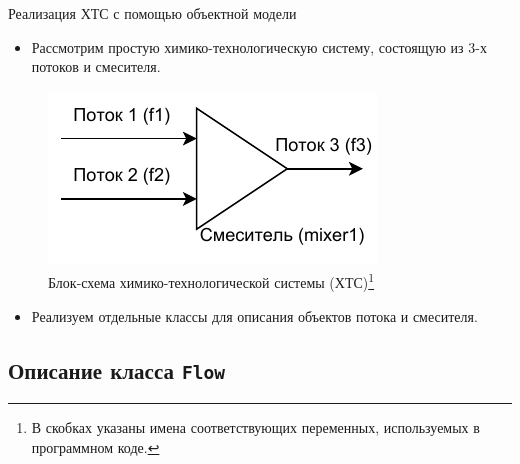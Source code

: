 \documentclass[aspectratio=169, mathserif]{beamer}	%
\begin{document}
\begin{frame}[fragile]{Реализация ХТС с помощью объектной модели}
\scriptsize
\begin{itemize}
\item Рассмотрим простую химико-технологическую систему, состоящую из 3-х потоков и смесителя.
\end{itemize}
\vfill
\begin{figure}[h!]
\includegraphics[width=.5\textwidth]{./pics/pfd}
\caption{Блок-схема химико-технологической системы (ХТС)\footnote{\tiny{В скобках указаны имена соответствующих переменных, используемых в программном коде.}}}
\end{figure}
\vfill
\begin{itemize}
\item Реализуем отдельные классы для описания объектов потока и смесителя.
\end{itemize}
\vfill
\end{frame}

\subsection{Описание класса \texttt{Flow}}
\end{document}
